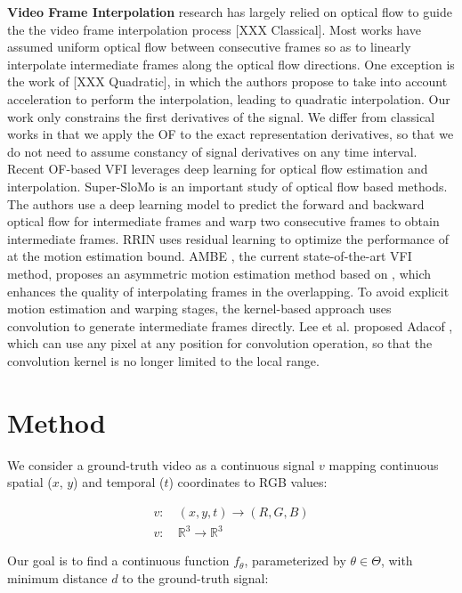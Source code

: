 \documentclass{article}
\begin{document}
\textbf{Video Frame Interpolation} research has largely relied on optical flow to guide the the video frame interpolation process [XXX Classical].
Most works have assumed uniform optical flow between consecutive frames so as to linearly interpolate intermediate frames along the optical flow directions.
One exception is the work of [XXX Quadratic], in which the authors propose to take into account acceleration to perform the interpolation,
leading to quadratic interpolation.
Our work only constrains the first derivatives of the signal.
We differ from classical works in that we apply the OF to the exact representation derivatives,
so that we do not need to assume constancy of signal derivatives on any time interval.
Recent OF-based VFI leverages deep learning for optical flow estimation and interpolation.
Super-SloMo \cite{jiang2018super} is an important study of optical flow based methods.
The authors use a deep learning model to predict the forward and backward optical flow for intermediate frames and warp two consecutive frames to obtain intermediate frames.
RRIN \cite{li2020video} uses residual learning to optimize the performance of \cite{jiang2018super} at the motion estimation bound.
AMBE \cite{park2021asymmetric}, the current state-of-the-art VFI method, proposes an asymmetric motion estimation method based on \cite{park2020bmbc}, which enhances the quality of interpolating frames in the overlapping.
To avoid explicit motion estimation and warping stages, the kernel-based approach uses convolution to generate intermediate frames directly.
Lee et al. proposed Adacof \cite{lee2020adacof}, which can use any pixel at any position for convolution operation, so that the convolution kernel is no longer limited to the local range.
\section{Method}
\label{sec_method}
We consider a ground-truth video as a continuous signal $v$ mapping continuous spatial ($x$, $y$) and temporal ($t$) coordinates to RGB values:

\begin{equation}
\begin{aligned}
v:& \: (x, y, t) \rightarrow (R, G, B) \\
v:& \: \mathbb{R}^3 \rightarrow \mathbb{R}^3
\end{aligned}
\end{equation}

Our goal is to find a continuous function $f_{\theta}$, parameterized by $\theta \in \Theta$,
with minimum distance $d$ to the ground-truth signal:
\end{document}
